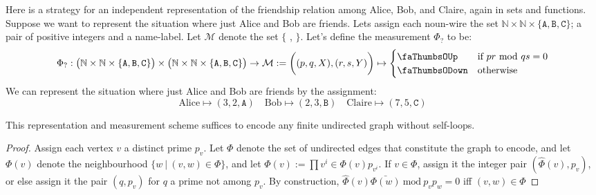 \begin{example}\label{ex:friendsINDEP}
Here is a strategy for an independent representation of the friendship relation among Alice, Bob, and Claire, again in sets and functions. Suppose we want to represent the situation where just Alice and Bob are friends. Lets assign each noun-wire the set $\mathbb{N} \times \mathbb{N} \times \{\texttt{A},\texttt{B},\texttt{C}\}$; a pair of positive integers and a name-label. Let $\mathcal{M}$ denote the set $\{$ \faThumbsOUp, \faThumbsODown $\}$. Let's define the measurement $\Phi_?$ to be:
\[\Phi_? : \big( \mathbb{N} \times \mathbb{N} \times \{\texttt{A},\texttt{B},\texttt{C} \} \big) \times \big( \mathbb{N} \times \mathbb{N} \times \{\texttt{A},\texttt{B},\texttt{C} \} \big) \rightarrow \mathcal{M} := \bigg((p,q,X),(r,s,Y)\bigg) \mapsto
\begin{cases}
\text{\faThumbsOUp} & 
\text{if }pr \ \text{mod} \ qs = 0 \\
\text{\faThumbsODown} & \text{otherwise}
\end{cases}
\]
We can represent the situation where just Alice and Bob are friends by the assignment:
\[\text{Alice} \mapsto (3,2,\texttt{A}) \quad \text{Bob} \mapsto (2,3,\texttt{B}) \quad \text{Claire} \mapsto (7,5,\texttt{C})\]
\begin{lemma}
This representation and measurement scheme suffices to encode any finite undirected graph without self-loops.
\begin{proof}
Assign each vertex $v$ a distinct prime $p_v$. Let $\Phi$ denote the set of undirected edges that constitute the graph to encode, and let $\Phi(v)$ denote the neighbourhood $\{w \ | \ (v,w) \in \Phi\}$, and let $\hat{\Phi}(v) := \prod\limits{v^i \in \Phi(v)} p_{v^i}$. If $v \in \Phi$, assign it the integer pair $(\hat{\Phi}(v),p_v)$, or else assign it the pair $(q,p_v)$ for $q$ a prime not among $p_v$. By construction, $\hat{\Phi}(v) \bar{\Phi(w)} \ \text{mod} \ p_v p_w = 0$ iff $(v,w) \in \Phi$
\end{proof}
\end{lemma}
\end{example}

\begin{theorem}

\end{theorem}


